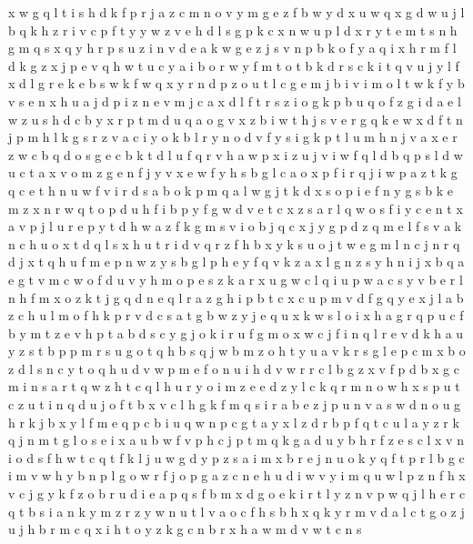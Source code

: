 \documentclass{article}
\begin{document}
x w g q l t i s h d k f p r j a z c m n o v y
m g e z f b w y
d x u w q
x g d w u j l b q k h z r i v c p f t y
y w z v e h d l s g p k c x n
w u p l d x r y t e
m t s n
h g m q s x
q y h r p s u z i n v d e a k
w g e z j s v n p b k o f y a q i x h
r m f l d k g z x j p e v q h w t u c y a i b o
r w y f m t
o t b k d r
s c k i t q v u j y l f x d
l g r e k
e
b s w k f
w q x y r n d p z o u t l c g e m j b i v
i m
o l t w k f y b v s e n x h u a j d p i z
n e v m j c a x d l f t r s z i o g k p
b u q o f z g i d
a e l w z u s h d c b y x r p
t m d u q a o g v x
z b i w t h j s v e r g
q k
e w x d f t n j p m h l k g s r z v a c i y o
k b l r y n o d v
f y s i g k p t l u m h n j v a x e r z w c b q d o
s g e c b k t d l u f q r v h a w p x i z
u j v i w f q l d b
q p s l d w u c t a x v o m z g e n f j y
v x e w f
y h s b g l c a o x p f i r q j
i w p a z t k
g q c e t h n u w f v i r d s a b o k p
m q a l w g j t k d x s o p i e f n y
g s b k e m z x n r w q t o p d u h f i
b p y f g w d v e t c x z s a r l q
w o s f i y c e n t x a v p j
l u r e p y t d h w a z f k g m s v i o b j q c x
j y g p d z q m e l f s v a k n c h u o x t
d q l s x h u t r
i d v q r z f h b x y k s u o j t w e g m l n c
j n r q
d j x t q h u f m e p n w z y s b g l
p h e y f q v k z a x l g n
z s y h n i j x b q a e g t v m c w o f d u
v y h m o p e s z k a r x u g w c l
q
i u p w a c s y v b e r l n h f m x o z k t j g q d
n e q l r a z g h i p b t c x
c u
p m v d f g q y e x j l a b z c h u
l m o f h k p r v d c s a t g b w z y j e q u x
k w s l o i x h a g r q p u c f b y m t z e v
h p t a b d s c y g j o k i r u f
g m o x w c j f i n q l r e v d k h a u y z s t b p
p m r s u g o t q h b
s q
j w b m z o h t y u a v k r s g l e p c
m x b o z d
l s n c y t o q h u d v w p m e f
o n u i h d v w r
r c l b g z x
v f p d b x g c m i n s a r t q w z h
t c q l h u r
y o i m z e
e d z y l c k q r m n o w h x s p u t
c z
u t i n
q d u j o f t b x
v c l h g k f m q s i r a b e z j p u n
v a s w d n o u g h r k j b x y l f m e q p c
b i u q w n p c g t a y x l z d r
b p f q t c u l a
y z r k q j n m t g l o s e i x a u b w f v p h c
j p t m q k g a d u y b h r f z e s c l x v n i o
d s f h w t
c q t f k l j u w g d y p z s a i m x b r
e j n u o k y q f t p r l b g c i m v w h
y b n p l g o w
r f j o p g a z c n e h u d i w v
y i m q u w l p z n f
h x v c j g y k f z o b r u d i e a p q
s f b m x d g o e k i r t l y z n v p w q
j l h e r c q t b s i a n k y m z
r z y w n u t l v a o c f h
s b h x q k y r m v d a l c t g o z j u
j h b
r m c q x i h t o
y z k g c n b r x h a w m d v
w t c n s
\end{document}
